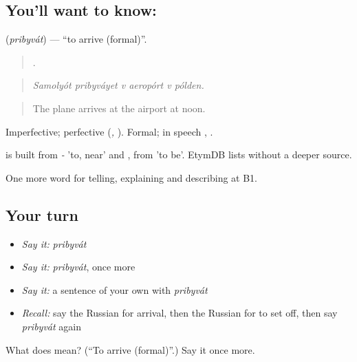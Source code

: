 \subsection*{You'll want to know: }
\textbf{} (\emph{pribyvát}) — \textquotedblleft{}to arrive (formal)\textquotedblright{}.

\begin{quote}
     .
\end{quote}

\begin{quote}
\emph{Samolyót pribyváyet v aeropórt v pólden.}
\end{quote}

\begin{quote}
The plane arrives at the airport at noon.
\end{quote}

Imperfective; perfective \emph{} (\emph{, }). Formal; in speech \emph{}, \emph{}.

\begin{cousinweb}
\emph{} is built from \emph{-} 'to, near' and \emph{}, from \emph{} 'to be'. EtymDB lists \emph{} without a deeper source.
\end{cousinweb}

\begin{grammarlens}[title={What you've built}]
One more word for telling, explaining and describing at B1.
\end{grammarlens}

\subsection*{Your turn}
\begin{itemize}
\raggedright
  \item \emph{Say it:} \emph{pribyvát}
  \item \emph{Say it:} \emph{pribyvát}, once more
  \item \emph{Say it:} a sentence of your own with \emph{pribyvát}
  \item \emph{Recall:} say the Russian for arrival, then the Russian for to set off, then say \emph{pribyvát} again
\end{itemize}

\begin{tcolorbox}[breakable,colback=teal!4,colframe=teal!35!black,title={Before you move on}]
What does  mean? (\textquotedblleft{}To arrive (formal)\textquotedblright{}.) Say it once more.
\end{tcolorbox}
